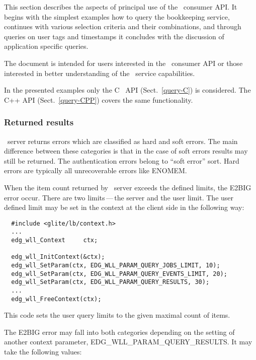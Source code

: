\def\partitle#1{\par{\textbf{#1}}\par}

\label{ConsOview}
This section describes the aspects of principal use of the \LB\ consumer API.
It begins with the simplest examples how to query the bookkeeping
service, continues with various selection criteria and their combinations, and
through queries on user tags and timestamps it concludes with the discussion of
application specific queries.

The document is intended for users interested in the \LB\
consumer API or those interested in better understanding of the \LB\ service 
capabilities.

In the presented examples only the C \LB\ API (Sect.~\ref{query-C}) is considered.
The C++ API (Sect.~\ref{query-CPP})  covers the same functionality.

\subsubsection{Returned results}

\LB\ server returns errors which are classified as hard and soft errors.
The main difference between these categories is that in the case of soft
errors results may still be returned.
The authentication errors belong to
``soft error'' sort. Hard errors are typically all unrecoverable errors like ENOMEM.

When the item count returned by \LB\ server exceeds the defined limits, the E2BIG error occur.
There are two limits\,---\,the server and the user limit. The user defined limit may be set in
the context at the client side in the following way:
\begin{verbatim}
  #include <glite/lb/context.h>
  ...
  edg_wll_Context     ctx;    

  edg_wll_InitContext(&ctx);
  edg_wll_SetParam(ctx, EDG_WLL_PARAM_QUERY_JOBS_LIMIT, 10);
  edg_wll_SetParam(ctx, EDG_WLL_PARAM_QUERY_EVENTS_LIMIT, 20);
  edg_wll_SetParam(ctx, EDG_WLL_PARAM_QUERY_RESULTS, 30);
  ...
  edg_wll_FreeContext(ctx);
\end{verbatim}
This code sets the user query limits to the given maximal count of items.

The E2BIG error may fall into both categories depending on the setting of
another context parameter, EDG\_WLL\_PARAM\_QUERY\_RESULTS.
It may take the following values:

